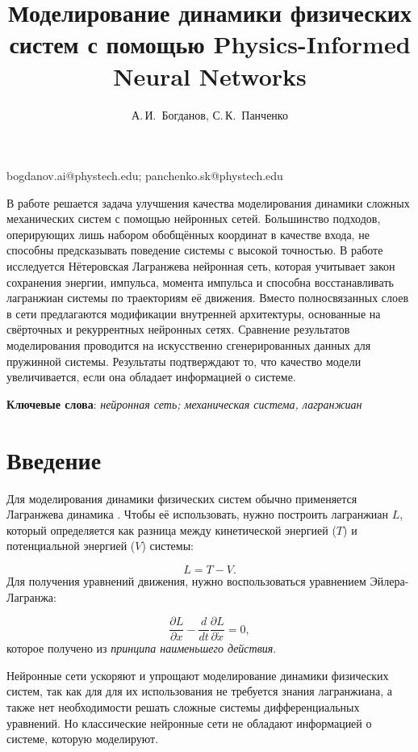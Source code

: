 \documentclass[12pt, twoside]{article}
\begin{document}
\title
    {Моделирование динамики физических систем с помощью Physics-Informed Neural Networks}
\author
    {А.\,И.~Богданов, С.\,К.~Панченко} 
\email
    {bogdanov.ai@phystech.edu; panchenko.sk@phystech.edu}
\abstract
    {В работе решается задача улучшения качества моделирования динамики сложных механических систем с помощью нейронных сетей. Большинство подходов, оперирующих лишь набором обобщённых координат в качестве входа, не способны предсказывать поведение системы с высокой точностью. В работе исследуется Нётеровская Лагранжева нейронная сеть, которая учитывает закон сохранения энергии, импульса, момента импульса и способна восстанавливать лагранжиан системы по траекториям её движения. Вместо полносвязанных слоев в сети предлагаются модификации внутренней архитектуры, основанные на свёрточных и рекуррентных нейронных сетях. Сравнение результатов моделирования проводится на искусственно сгенерированных данных для пружинной системы. Результаты подтверждают то, что качество модели увеличивается, если она обладает информацией о системе.
\bigskip

\noindent
\textbf{Ключевые слова}: \emph {нейронная сеть; механическая система, лагранжиан}

\receivedRus{-}
\receivedEng{-}
}

\maketitle

\section{Введение}
 
    Для моделирования динамики физических систем обычно применяется Лагранжева динамика \cite{landau1976mechanics}. Чтобы её использовать, нужно построить лагранжиан $L$, который определяется как разница между кинетической энергией ($T$) и потенциальной энергией ($V$) системы:

    $$L = T - V.$$
    Для получения уравнений движения, нужно воспользоваться уравнением Эйлера-Лагранжа:

    $$\frac{\partial L}{\partial x} - \frac{d}{dt} \frac{\partial L}{\partial \dot{x}} = 0,$$
    которое получено из \emph{принципа наименьшего действия}.

    Нейронные сети ускоряют и упрощают моделирование динамики физических систем, так как для для их использования не требуется знания лагранжиана, а также нет необходимости решать сложные системы дифференциальных уравнений. Но классические нейронные сети не обладают информацией о системе, которую моделируют.
\end{document}
